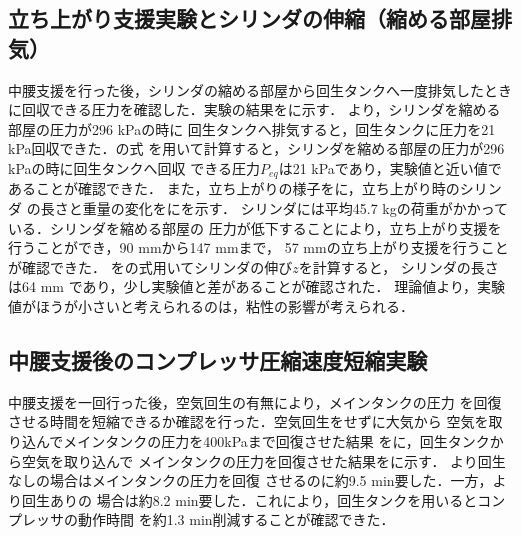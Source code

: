 \subsection{立ち上がり支援実験とシリンダの伸縮（縮める部屋排気）}
 中腰支援を行った後，シリンダの縮める部屋から回生タンクへ一度排気したとき
に回収できる圧力を確認した．実験の結果をに示す．
より，シリンダを縮める部屋の圧力が296 kPaの時に
回生タンクへ排気すると，回生タンクに圧力を21 kPa回収できた．の式
を用いて計算すると，シリンダを縮める部屋の圧力が296 kPaの時に回生タンクへ回収
できる圧力$P_{eq}$は21 kPaであり，実験値と近い値であることが確認できた．
また，立ち上がりの様子をに，立ち上がり時のシリンダ
の長さと重量の変化をにを示す．
シリンダには平均45.7 kgの荷重がかかっている．シリンダを縮める部屋の
圧力が低下することにより，立ち上がり支援を行うことができ，90 mmから147 mmまで，
57 mmの立ち上がり支援を行うことが確認できた．
をの式用いてシリンダの伸び$z$を計算すると，
シリンダの長さは64 mm であり，少し実験値と差があることが確認された．
理論値より，実験値がほうが小さいと考えられるのは，粘性の影響が考えられる．
\subsection{中腰支援後のコンプレッサ圧縮速度短縮実験}
中腰支援を一回行った後，空気回生の有無により，メインタンクの圧力
を回復させる時間を短縮できるか確認を行った．空気回生をせずに大気から
空気を取り込んでメインタンクの圧力を400kPaまで回復させた結果
をに，回生タンクから空気を取り込んで
メインタンクの圧力を回復させた結果をに示す．
より回生なしの場合はメインタンクの圧力を回復
させるのに約9.5 min要した．一方，より回生ありの
場合は約8.2 min要した．これにより，回生タンクを用いるとコンプレッサの動作時間
を約1.3 min削減することが確認できた．